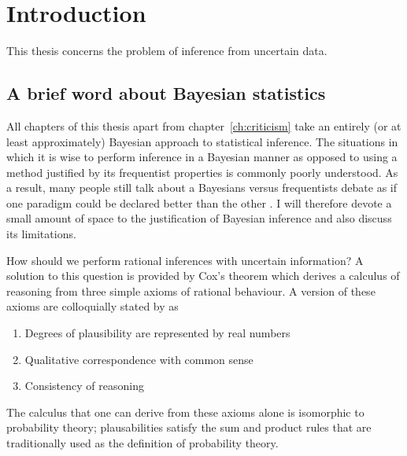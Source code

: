 
\inbpdocument

\chapter{Introduction}
\label{ch:intro}

This thesis concerns the problem of inference from uncertain data.

\section{A brief word about Bayesian statistics}

All chapters of this thesis apart from chapter~\ref{ch:criticism} take an entirely (or at least approximately) Bayesian approach to statistical inference.
The situations in which it is wise to perform inference in a Bayesian manner as opposed to using a method justified by its frequentist properties is commonly poorly understood.
As a result, many people still talk about a Bayesians versus frequentists debate as if one paradigm could be declared better than the other .
I will therefore devote a small amount of space to the justification of Bayesian inference and also discuss its limitations.

How should we perform rational inferences with uncertain information?
A solution to this question is provided by Cox's theorem which derives a calculus of reasoning from three simple axioms of rational behaviour.
A version of these axioms are colloquially stated by \citet{Edwin2003-jh} as
\begin{enumerate}
  \item Degrees of plausibility are represented by real numbers
  \item Qualitative correspondence with common sense
  \item Consistency of reasoning
\end{enumerate}
The calculus that one can derive from these axioms alone is isomorphic to probability theory; plausabilities satisfy the sum and product rules that are traditionally used as the definition of probability theory.

